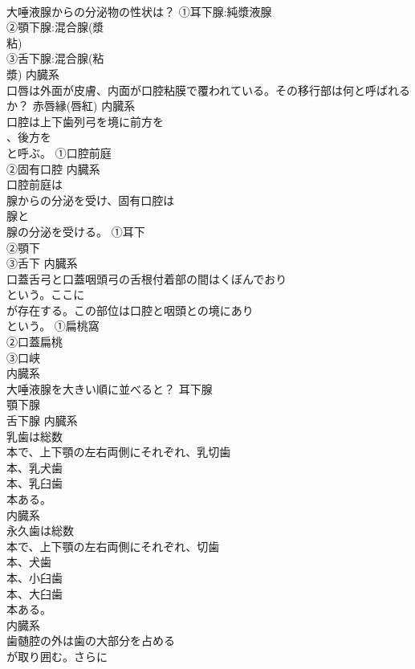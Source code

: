 \documentclass[8pt]{extreport}
\begin{document}
\begin{CJK}{UTF8}{min}
\\	大唾液腺からの分泌物の性状は？	①耳下腺:純漿液腺
\\	②顎下腺:混合腺(漿
\\	粘)
\\	③舌下腺:混合腺(粘
\\	漿)	内臓系
\\	口唇は外面が皮膚、内面が口腔粘膜で覆われている。その移行部は何と呼ばれるか？	赤唇縁(唇紅)	内臓系
\\	口腔は上下歯列弓を境に前方を
\\	、後方を
\\	と呼ぶ。	①口腔前庭
\\	②固有口腔	内臓系
\\	口腔前庭は
\\	腺からの分泌を受け、固有口腔は
\\	腺と
\\	腺の分泌を受ける。	①耳下
\\	②顎下
\\	③舌下	内臓系
\\	口蓋舌弓と口蓋咽頭弓の舌根付着部の間はくぼんでおり
\\	という。ここに
\\	が存在する。この部位は口腔と咽頭との境にあり
\\	という。	①扁桃窩
\\	②口蓋扁桃
\\	③口峡
\\	内臓系
\\	大唾液腺を大きい順に並べると？	耳下腺
\\	顎下腺
\\	舌下腺	内臓系
\\	乳歯は総数
\\	本で、上下顎の左右両側にそれぞれ、乳切歯
\\	本、乳犬歯
\\	本、乳臼歯
\\	本ある。	
\\	内臓系
\\	永久歯は総数
\\	本で、上下顎の左右両側にそれぞれ、切歯
\\	本、犬歯
\\	本、小臼歯
\\	本、大臼歯
\\	本ある。	
\\	内臓系
\\	歯髄腔の外は歯の大部分を占める
\\	が取り囲む。さらに

\end{CJK}
\end{document}
